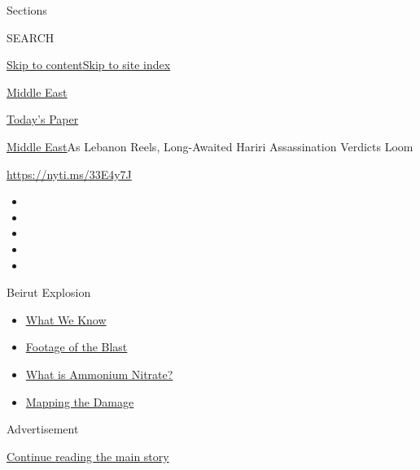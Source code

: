Sections

SEARCH

\protect\hyperlink{site-content}{Skip to
content}\protect\hyperlink{site-index}{Skip to site index}

\href{https://www.nytimes.com/section/world/middleeast}{Middle East}

\href{https://myaccount.nytimes.com/auth/login?response_type=cookie\&client_id=vi}{}

\href{https://www.nytimes.com/section/todayspaper}{Today's Paper}

\href{/section/world/middleeast}{Middle East}\textbar{}As Lebanon Reels,
Long-Awaited Hariri Assassination Verdicts Loom

\href{https://nyti.ms/33E4y7J}{https://nyti.ms/33E4y7J}

\begin{itemize}
\item
\item
\item
\item
\item
\end{itemize}

Beirut Explosion

\begin{itemize}
\tightlist
\item
  \href{https://www.nytimes.com/2020/08/05/world/middleeast/beirut-explosion-what-happened.html?action=click\&pgtype=Article\&state=default\&region=TOP_BANNER\&context=storylines_menu}{What
  We Know}
\item
  \href{https://www.nytimes.com/2020/08/05/video/beirut-explosion-footage.html?action=click\&pgtype=Article\&state=default\&region=TOP_BANNER\&context=storylines_menu}{Footage
  of the Blast}
\item
  \href{https://www.nytimes.com/2020/08/05/world/middleeast/beirut-explosion-ammonium-nitrate.html?action=click\&pgtype=Article\&state=default\&region=TOP_BANNER\&context=storylines_menu}{What
  is Ammonium Nitrate?}
\item
  \href{https://www.nytimes.com/interactive/2020/08/04/world/middleeast/beirut-explosion-damage.html?action=click\&pgtype=Article\&state=default\&region=TOP_BANNER\&context=storylines_menu}{Mapping
  the Damage}
\end{itemize}

Advertisement

\protect\hyperlink{after-top}{Continue reading the main story}


